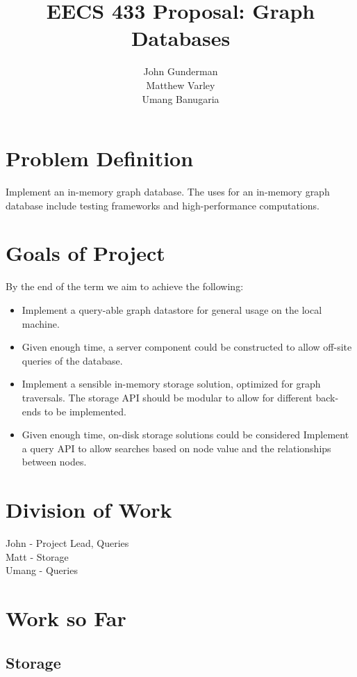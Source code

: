 \documentclass[11pt]{article}
\title{EECS 433 Proposal: Graph Databases}
\author{John Gunderman\\
		Matthew Varley\\
		Umang Banugaria}
\date{}
\begin{document}
\maketitle
\tableofcontents

\section{Problem Definition}
Implement an in-memory graph database. The uses for an in-memory graph database include testing frameworks and high-performance computations.

\section{Goals of Project}
By the end of the term we aim to achieve the following:

\begin{itemize}
\item Implement a query-able graph datastore for general usage on the local machine.
\item Given enough time, a server component could be constructed to allow off-site queries of the database.
\item Implement a sensible in-memory storage solution, optimized for graph traversals. The storage API should be modular to allow for different back-ends to be implemented.
\item Given enough time, on-disk storage solutions could be considered
Implement a query API to allow searches based on node value and the relationships between nodes.
\end{itemize}

\section{Division of Work}

John - Project Lead, Queries \\
Matt - Storage \\
Umang -  Queries \\

\section{Work so Far}

\subsection{Storage}
\end{document}
